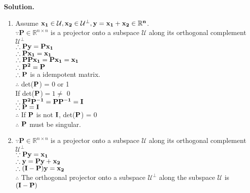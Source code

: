 \documentclass[english,onecolumn]{IEEEtran}
\newcommand{\Rbb}{\mathbb{R}}
\newcommand{\Pb}{\mathbf{P}}
\begin{document}
\noindent
\textbf{Solution.}
\begin{enumerate}
    \item
    Assume $ \bf{x_1} \in \mathcal{U}, \bf{x_2} \in \mathcal{U}^{\perp}, \bf{y = x_1 + x_2} \in \mathbb{R}^n$.\\
    $\because \Pb\in \Rbb^{n\times n}$ is a projector onto a subspace $\mathcal{U}$ along its orthogonal complement $\mathcal{U}^{\perp}$\\
    $\therefore \bf{P y = P x_1}$\\
    $\therefore \bf{P x_1 = x_1} $\\
    $\therefore \bf{P P x_1=P x_1=x_1}$\\
    $\therefore \bf{P^2 = P} $\\
    $\therefore \bf{P} $ is a idempotent matrix. \\
    $\therefore $  det($\bf{P}$) = 0 or 1\\
    If det($\bf{P}$)$ = 1 \neq$ 0\\
    $\therefore \bf{P^{2} P^{-1} = P P^{-1}}= I$\\
    $\therefore \bf{P = I}$\\
    $\therefore$ If $\bf{P} $ is not $\bf{I}$, det($\bf{P}$) = 0\\
    $\therefore$ $\bf{P}$ must be singular.\\
    
    \item
    $\because \Pb\in \Rbb^{n\times n}$ is a projector onto a subspace $\mathcal{U}$ along its orthogonal complement $\mathcal{U}^{\perp}$\\
    $\because \bf{P y = x_1}$\\
    $\therefore \bf{y = P y + x_2 }$ \\
    $\therefore \bf{(I-P)y = x_2}$\\
    $\therefore $ The orthogonal projector onto a subspace $\mathcal{U}^{\perp}$ along the subspace $\mathcal{U}$ is $\bf{(I-P)}$  \\
    

\end{enumerate}
\end{document}
